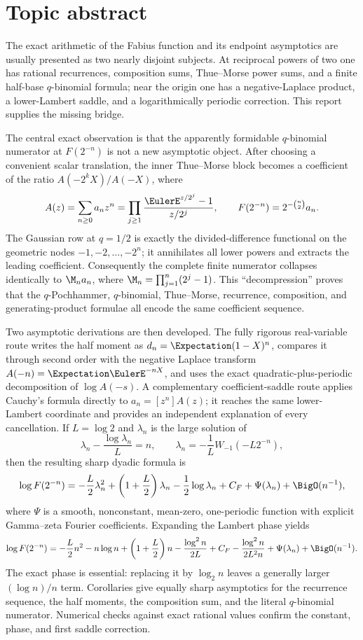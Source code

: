 \documentclass[11pt,oneside]{article}
\theoremstyle{definition}
\theoremstyle{remark}
\begin{document}
\section*{Topic abstract}
The exact arithmetic of the Fabius function and its endpoint asymptotics are usually presented
as two nearly disjoint subjects.  At reciprocal powers of two one has rational recurrences,
composition sums, Thue--Morse power sums, and a finite half-base $q$-binomial formula; near the
origin one has a negative-Laplace product, a lower-Lambert saddle, and a logarithmically
periodic correction.  This report supplies the missing bridge.

The central exact observation is that the apparently formidable $q$-binomial numerator at
$F(2^{-n})$ is not a new asymptotic object.  After choosing a convenient scalar translation,
the inner Thue--Morse block becomes a coefficient of the ratio
$A(-2^kX)/A(-X)$, where
\[
 A(z)=\sum_{n\ge0}a_nz^n
     =\prod_{j\ge1}\frac{\EulerE^{z/2^j}-1}{z/2^j},
 \qquad
 F(2^{-n})=2^{-\binom n2}a_n.
\]
The Gaussian row at $q=1/2$ is exactly the divided-difference functional on the geometric
nodes $-1,-2,\ldots,-2^n$; it annihilates all lower powers and extracts the leading
coefficient.  Consequently the complete finite numerator collapses identically to
$\M_na_n$, where $\M_n=\prod_{j=1}^n(2^j-1)$.  This ``decompression'' proves that the
$q$-Pochhammer, $q$-binomial, Thue--Morse, recurrence, composition, and generating-product
formulae all encode the same coefficient sequence.

Two asymptotic derivations are then developed.  The fully rigorous real-variable route writes
the half moment as $d_n=\Expectation(1-X)^n$, compares it through second order with the negative
Laplace transform $A(-n)=\Expectation\EulerE^{-nX}$, and uses the exact quadratic-plus-periodic
decomposition of $\log A(-s)$.  A complementary coefficient-saddle route applies Cauchy's
formula directly to $a_n=[z^n]A(z)$; it reaches the same lower-Lambert coordinate and provides
an independent explanation of every cancellation.  If $L=\log2$ and $\lambda_n$ is the
large solution of
\[
 \lambda_n-\frac{\log\lambda_n}{L}=n,
 \qquad
 \lambda_n=-\frac1L W_{-1}(-L2^{-n}),
\]
then the resulting sharp dyadic formula is
\[
 \log F(2^{-n})=
 -\frac L2\lambda_n^2+
 \left(1+\frac L2\right)\lambda_n-\frac12\log\lambda_n
 +C_F+\Psi(\lambda_n)+\BigO(n^{-1}),
\]
where $\Psi$ is a smooth, nonconstant, mean-zero, one-periodic function with explicit
Gamma--zeta Fourier coefficients.  Expanding the Lambert phase yields
\[
 \log F(2^{-n})=
 -\frac L2n^2-n\log n+\left(1+\frac L2\right)n
 -\frac{\log^2n}{2L}+C_F-
 \frac{\log^2n}{2L^2n}+\Psi(\lambda_n)+\BigO(n^{-1}).
\]
The exact phase is essential: replacing it by $\log_2n$ leaves a generally larger
$(\log n)/n$ term.  Corollaries give equally sharp asymptotics for the recurrence sequence,
the half moments, the composition sum, and the literal $q$-binomial numerator.  Numerical
checks against exact rational values confirm the constant, phase, and first saddle
correction.
\end{document}
